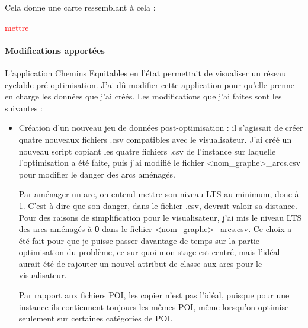 Cela donne une carte ressemblant à cela :

\textcolor{red}{mettre}



\paragraph{Modifications apportées}

L'application Chemins Equitables en l'état permettait de visualiser un réseau cyclable pré-optimisation. J'ai dû modifier cette application pour qu'elle prenne en charge les données que j'ai créés. Les modifications que j'ai faites sont les suivantes :

\begin{itemize}
    \item Création d'un nouveau jeu de données post-optimisation : il s'agissait de créer quatre nouveaux fichiers .csv compatibles avec le visualisateur. J'ai créé un nouveau script copiant les quatre fichiers .csv de l'instance sur laquelle l'optimisation a été faite, puis j'ai modifié le fichier <nom\_graphe>\_arcs.csv pour modifier le danger des arcs aménagés.
    
    Par aménager un arc, on entend mettre son niveau LTS au minimum, donc à 1. C'est à dire que son danger, dans le fichier .csv, devrait valoir sa distance. Pour des raisons de simplification pour le visualisateur, j'ai mis le niveau LTS des arcs aménagés à \textbf{0} dans le fichier <nom\_graphe>\_arcs.csv. Ce choix a été fait pour que je puisse passer davantage de temps sur la partie optimisation du problème, ce sur quoi mon stage est centré, mais l'idéal aurait été de rajouter un nouvel attribut de classe aux arcs pour le visualisateur.
    
    Par rapport aux fichiers POI, les copier n'est pas l'idéal, puisque pour une instance ils contiennent toujours les mêmes POI, même lorsqu'on optimise seulement sur certaines catégories de POI. 


\end{itemize}
